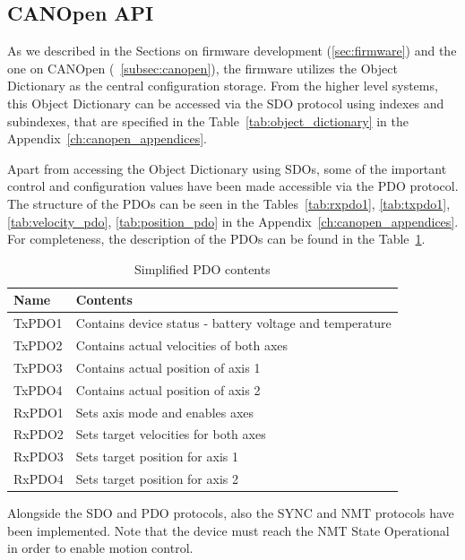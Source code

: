 \subsection{CANOpen API}
As we described in the Sections on firmware development (\ref{sec:firmware}) and the one on CANOpen (~\ref{subsec:canopen}), the firmware utilizes the Object Dictionary as the central configuration storage.
From the higher level systems, this Object Dictionary can be accessed via the SDO protocol using indexes and subindexes, that are specified in the Table~\ref{tab:object_dictionary} in the Appendix~\ref{ch:canopen_appendices}.

Apart from accessing the Object Dictionary using SDOs, some of the important control and configuration values have been made accessible via the PDO protocol.
The structure of the PDOs can be seen in the Tables~\ref{tab:rxpdo1}, \ref{tab:txpdo1}, \ref{tab:velocity_pdo}, \ref{tab:position_pdo} in the Appendix~\ref{ch:canopen_appendices}.
For completeness, the description of the PDOs can be found in the Table~\ref{tab:pdo_meaning}.

\begin{table}[H]
    \centering
    \begin{tabular}{ |p{3cm}|p{10cm}| }
        \hline
        Name & Contents \\
        \hline
        \hline
        TxPDO1 & Contains device status - battery voltage and temperature \\
        \hline
        TxPDO2 & Contains actual velocities of both axes \\
        \hline
        TxPDO3 & Contains actual position of axis 1 \\
        \hline
        TxPDO4 & Contains actual position of axis 2 \\
        \hline
        RxPDO1 & Sets axis mode and enables axes \\
        \hline
        RxPDO2 & Sets target velocities for both axes \\
        \hline
        RxPDO3 & Sets target position for axis 1 \\
        \hline
        RxPDO4 & Sets target position for axis 2 \\
        \hline
    \end{tabular}
    \caption{Simplified PDO contents}
    \label{tab:pdo_meaning}
\end{table}

Alongside the SDO and PDO protocols, also the SYNC and NMT protocols have been implemented.
Note that the device must reach the NMT State Operational in order to enable motion control.

